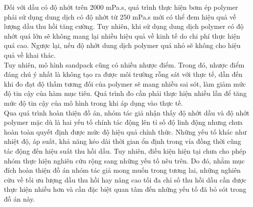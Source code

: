 \documentclass[12pt,a4paper]{article}
\begin{document}
	Đối với dầu có độ nhớt trên 2000 mPa.s, quá trình thực hiện bơm ép polymer phải sử dụng dung dịch có độ nhớt từ 250 mPa.s mới có thể đem hiệu quả về lượng dầu thu hồi tăng cường. Tuy nhiên, khi sử dụng dung dịch polymer có độ nhớt quá lớn sẽ không mang lại nhiều hiệu quả về kinh tế do chi phí thực hiện quá cao. Ngược lại, nếu độ nhớt dung dịch polymer quá nhỏ sẽ không cho hiệu quả về khai thác.\\
	Tuy nhiên, mô hình sandpack cũng có nhiều nhược điểm. Trong đó, nhược điểm đáng chú ý nhất là không tạo ra được môi trường rỗng sát với thực tế, dẫn đến khi đo đạt độ thấm tương đối của polymer sẽ mang nhiều sai sót, làm giảm mức độ tin cậy của hàm mục tiêu. Quá trình đo cần phải thực hiện nhiều lần để tăng mức độ tin cậy của mô hình trong khi áp dụng vào thực tế.\\
	Qua quá trình hoàn thiện đồ án, nhóm tác giả nhận thấy độ nhớt dầu và độ nhớt polymer mặc dù là hai yếu tố chính tác động lên tỉ số độ linh động nhưng chưa hoàn toàn quyết định được mức độ hiệu quả chính thức. Những yếu tố khác như nhiệt độ, áp suất, khả năng kéo dài thời gian ổn định trong vỉa đồng thời cũng tác động đến hiệu suất thu hồi dầu. Tuy nhiên, điều kiện hiện tại chưa cho phép nhóm thực hiện nghiên cứu rộng sang những yếu tố nêu trên. Do đó, nhằm mục đích hoàn thiện đồ án nhóm tác giả mong muốn trong tương lai, những nghiên cứu về tối ưu lượng dầu thu hồi hay nâng cao tối đa chỉ số thu hồi dầu cần được thực hiện nhiều hơn và cần đặc biệt quan tâm đến những yếu tố đã bỏ sót trong đồ án này.
	\newpage



\end{document}
